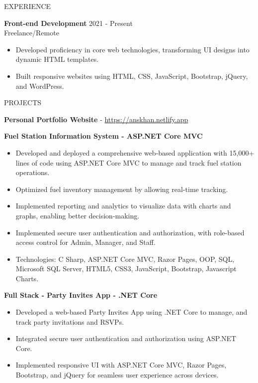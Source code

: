 \documentclass{resume} %
\begin{document}
\begin{rSection}{EXPERIENCE}
	
	\textbf{Front-end Development} \hfill 2021  - Present\\
	Freelance/Remote  \hfill %
	\begin{itemize}
		\itemsep -3pt {} 
		\item Developed proficiency in core web technologies, transforming UI designs into dynamic HTML templates.
		\item Built responsive websites using HTML, CSS, JavaScript, Bootstrap, jQuery, and WordPress. \\
		
	\end{itemize}
	
	
	

  
\begin{rSection}{PROJECTS}
\vspace{-1.25em}
\item \textbf{Personal Portfolio Website}  - \href{https://anskhan.netlify.app}{https://anskhan.netlify.app}

\item \textbf{Fuel Station Information System - ASP.NET Core MVC}

\begin{itemize}
	\item Developed and deployed a comprehensive web-based application with 15,000+ lines of code using ASP.NET Core MVC to manage and track fuel station operations.
	\item Optimized fuel inventory management by allowing real-time tracking.
	\item Implemented reporting and analytics to visualize data with charts and graphs, enabling better decision-making.
	
	\item Implemented secure user authentication and authorization, with role-based access control for Admin, Manager, and Staff.
	\item Technologies: C Sharp, ASP.NET Core MVC, Razor Pages, OOP, SQL, Microsoft SQL Server, HTML5, CSS3, JavaScript, Bootstrap, Javascript Charts.
\end{itemize}

\item \textbf{Full Stack - Party Invites App - .NET Core}
\begin{itemize}
	\item Developed a web-based Party Invites App using .NET Core to  manage, and track party invitations and RSVPs.
	\item Integrated secure user authentication and authorization using ASP.NET Core.
	\item Implemented responsive UI with ASP.NET Core MVC, Razor Pages, Bootstrap, and jQuery for seamless user experience across devices.
	

\end{itemize}
\end{rSection}
\end{rSection}
\end{document}
